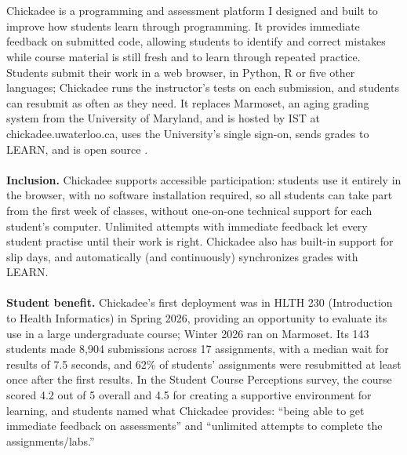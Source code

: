 \documentclass[11pt]{article}
\begin{document}
\begin{cvparts}



\end{cvparts}

\ifAPR %
\sectionbreak
{}
\\ \\
Chickadee is a programming and assessment platform I designed and built to improve how students learn through programming. It provides immediate feedback on submitted code, allowing students to identify and correct mistakes while course material is still fresh and to learn through repeated practice. Students submit their work in a web browser, in Python, R or five other languages; Chickadee runs the instructor's tests on each submission, and students can resubmit as often as they need. It replaces Marmoset, an aging grading system from the University of Maryland, and is hosted by IST at chickadee.uwaterloo.ca, uses the University's single sign-on, sends grades to LEARN, and is open source .
\\ \\
\textbf{Inclusion.} Chickadee supports accessible participation: students use it entirely in the browser, with no software installation required, so all students can take part from the first week of classes, without one-on-one technical support for each student's computer. Unlimited attempts with immediate feedback let every student practise until their work is right. Chickadee also has built-in support for slip days, and automatically (and continuously) synchronizes grades with LEARN.
\\ \\
\textbf{Student benefit.} Chickadee's first deployment was in HLTH 230 (Introduction to Health Informatics) in Spring 2026, providing an opportunity to evaluate its use in a large undergraduate course; Winter 2026 ran on Marmoset. Its 143 students made 8,904 submissions across 17 assignments, with a median wait for results of 7.5 seconds, and 62\% of students' assignments were resubmitted at least once after the first results. In the Student Course Perceptions survey, the course scored 4.2 out of 5 overall and 4.5 for creating a supportive environment for learning, and students named what Chickadee provides: ``being able to get immediate feedback on assessments'' and ``unlimited attempts to complete the assignments/labs.''
\end{document}
